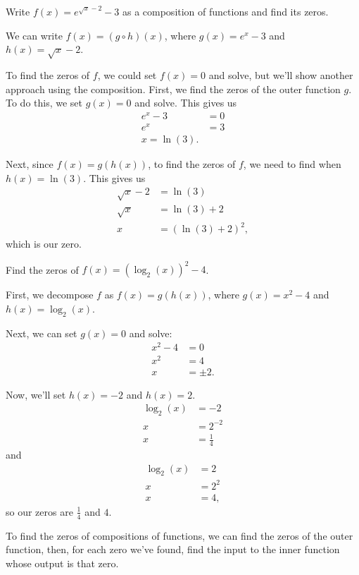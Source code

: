 \documentclass[nooutcomes]{ximera}
\begin{document}
\begin{example}
Write $f(x) = e^{\sqrt{x} - 2} - 3$ as a composition of functions and find its zeros.
\begin{explanation}
We can write $f(x) = (g \circ h)(x)$, where $g(x) = e^x - 3$ and $h(x) = \sqrt{x} - 2$. 

To find the zeros of $f$, we could set $f(x) = 0$ and solve, but we'll show another approach using the composition. First, we find the zeros of the outer function $g$. To do this, we set $g(x) = 0$ and solve. This gives us
\begin{align*}
e^x - 3 & = 0\\
e^x & = 3 \\
x = \ln(3).
\end{align*}

Next, since $f(x) = g(h(x))$, to find the zeros of $f$, we need to find when $h(x) = \ln(3)$. This gives us
\begin{align*}
\sqrt{x} - 2 & = \ln(3)\\
\sqrt{x} & = \ln(3) + 2 \\
x & = (\ln(3) + 2)^2,
\end{align*}
which is our zero. 


\end{explanation}
\end{example}

\begin{example}
Find the zeros of $f(x) = (\log_2(x))^2 - 4$. 
\begin{explanation}
First, we decompose $f$ as $f(x) = g(h(x))$, where $g(x) = x^2 - 4$ and $h(x) = \log_2(x)$.

Next, we can set $g(x) = 0$ and solve:
\begin{align*}
x^2 - 4 & = 0 \\
x^2 & = 4 \\
x & = \pm 2.
\end{align*}

Now, we'll set $h(x) = -2$ and $h(x) = 2$. 
\begin{align*}
\log_2(x) & = -2 \\
x & = 2^{-2} \\
x & = \frac{1}{4}
\end{align*}
and
\begin{align*}
\log_2(x) & = 2 \\
x & = 2^{2} \\
x & = 4,
\end{align*}
so our zeros are $\frac{1}{4}$ and $4$. 
\end{explanation}
\end{example}


To find the zeros of compositions of functions, we can find the zeros of the outer function, then, for each zero we've found, find the input to the inner function whose output is that zero. 

\end{document}

